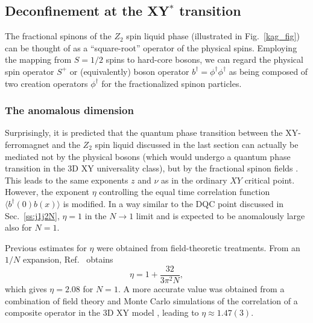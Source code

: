 \documentclass[10pt,pre,aps,twocolumn,showpacs,superscriptaddress,floatfix]{revtex4-1}
\begin{document}
\subsection{Deconfinement at the XY$^*$ transition} 
\label{XYstar}

The fractional spinons of the $Z_2$ spin liquid phase (illustrated in Fig.~\ref{kag_fig}) can be thought of as a ``square-root'' operator of the physical spins.  Employing the mapping from $S=1/2$ spins to hard-core bosons, we can regard the physical spin operator $S^+$ or (equivalently) boson operator $b^{\dagger}=\phi^\dagger\phi^\dagger$ as being composed of two creation
operators $\phi^\dagger$ for the fractionalized spinon particles.  

\subsubsection{The anomalous dimension}

Surprisingly, it is predicted that the quantum phase transition between the XY-ferromagnet 
and the $Z_2$ spin liquid discussed in the last section can actually be mediated not by the physical bosons (which would undergo a quantum phase transition in the 3D XY universality class), but by the fractional spinon fields \cite{XYstar1,XYstar2,earlyXYstar}.  This leads to the same exponents $z$ and $\nu$ as in the ordinary $XY$ critical point.  However, the exponent $\eta$ controlling the equal time correlation function $\langle b^\dagger(0) b(x) \rangle$ 
is modified. In a way similar to the DQC point discussed in Sec.~\ref{ss:j1j2N}, $\eta=1$ in the $N\to 1$ limit and is expected to be anomalously large also for $N=1$.

Previous estimates for $\eta$ were obtained from field-theoretic treatments. From an $1/N$ expansion, Ref.~\cite{XYstar2} obtains
\begin{equation}
\eta = 1 + \frac{32}{3 \pi^2 N},
\end{equation}
which gives $\eta = 2.08$ for $N=1$.
A more accurate value was obtained from a combination of field theory and Monte Carlo simulations of the correlation of a composite operator in the 3D XY 
model \cite{compositefieldtheory,compositeMC}, leading to $\eta\approx  1.47(3)$.
\end{document}
